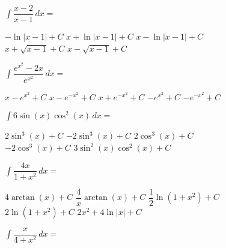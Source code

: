 \begin{questions}
    \question $\int \dfrac{x - 2}{x - 1} \, dx = $ \\

    \begin{oneparchoices}
        \choice $-\ln |x - 1| + C$
        \choice $x + \ln |x - 1| + C$
        \choice $x - \ln |x - 1| + C$ \\[11pt]
        \makebox[0.21\textwidth] \choice $x + \sqrt{x - 1} + C$
        \makebox[0.22\textwidth] \choice $x - \sqrt{x - 1} + C$
    \end{oneparchoices} \par \horizontalline

    \question $\int \dfrac{e^{x^2} - 2x}{e^{x^2}} \, dx = $ \\

    \begin{oneparchoices}
        \choice $x - e^{x^2} + C$ 
        \choice $x - e^{-x^2} + C$
        \choice $x + e^{-x^2} + C$
        \choice $-e^{x^2} + C$
        \choice $-e^{-x^2} + C$
    \end{oneparchoices} \par \horizontalline

    \question $\int 6\sin (x)\cos^2 (x) \, dx = $ \\

    \begin{oneparchoices}
        \choice $2\sin^3 (x) + C$
        \choice $-2\sin^3 (x) + C$
        \choice $2\cos^3 (x) + C$ \\[11pt]
        \makebox[0.20\textwidth] \choice $-2\cos^3 (x) + C$
        \makebox[0.22\textwidth] \choice $3\sin^2 (x)\cos^2 (x) + C$
    \end{oneparchoices} \par \horizontalline

    \question $\int \dfrac{4x}{1 + x^2} \, dx = $ \\

    \begin{oneparchoices}
        \choice $4\arctan (x) + C$
        \choice $\dfrac{4}{x}\arctan(x) + C$
        \choice $\dfrac{1}{2}\ln \left(1 + x^2\right) + C$ \\[11pt]
        \makebox[0.20\textwidth] \choice $2\ln \left(1 + x^2\right) + C$
        \makebox[0.21\textwidth] \choice $2x^2 + 4\ln |x| + C$
    \end{oneparchoices} \par \horizontalline

    \question $\int \dfrac{x}{4 + x^2} \, dx = $ \\
    

\end{questions}
